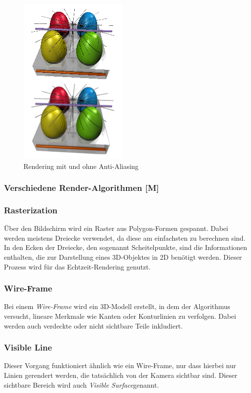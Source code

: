 \begin{figure}
    \centering
    \includegraphics[scale=0.7]{pics/anti-aliasing.png}
    \caption{Rendering mit und ohne Anti-Aliasing \cite{AntiAliasing}}
    \label{fig:impl:anti-aliasing}
\end{figure}

\subsubsection{Verschiedene Render-Algorithmen [M]}
\subsubsection{Rasterization}
Über den Bildschirm wird ein Raster aus Polygon-Formen gespannt. Dabei werden meistens Dreiecke verwendet, da diese am einfachsten zu berechnen sind. In den Ecken der Dreiecke, den sogenannt Scheitelpunkte, sind die Informationen enthalten, die zur Darstellung eines 3D-Objektes in 2D benötigt werden. Dieser Prozess wird für das Echtzeit-Rendering genutzt. \cite{RayTracingRasterization}

\subsubsection{Wire-Frame}
Bei einem \emph{Wire-Frame} wird ein 3D-Modell erstellt, in dem der Algorithmus versucht, lineare Merkmale wie Kanten oder Konturlinien zu verfolgen. Dabei werden auch verdeckte oder nicht sichtbare Teile inkludiert. 
\cite{Rendering3DModels} 

\subsubsection{Visible Line}
Dieser Vorgang funktioniert ähnlich wie ein Wire-Frame, nur dass hierbei nur Linien gerendert werden, die tatsächlich von der Kamera sichtbar sind. Dieser sichtbare Bereich wird auch \emph{Visible Surface}genannt. 
\cite{Rendering3DModels} 

